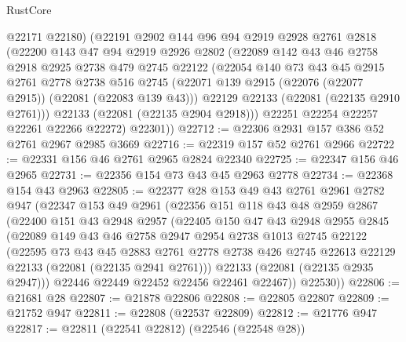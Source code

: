 \begin{lexlean}{RustCore}
\begin{coremodule}
        @22171
        @22180)
      (@22191
        @2902
        @144
        @96
        @94
        @2919
        @2928
        @2761
        @2818
        (@22200
          @143
          @47
          @94
          @2919
          @2926
          @2802
          (@22089
            @142
            @43
            @46
            @2758
            @2918
            @2925
            @2738
            @479
            @2745
            @22122
            (@22054
              @140
              @73
              @43
              @45
              @2915
              @2761
              @2778
              @2738
              @516
              @2745
              (@22071 @139 @2915 (@22076 (@22077 @2915)) (@22081 (@22083 @139 @43)))
              @22129
              @22133
              (@22081 (@22135 @2910 @2761)))
            @22133
            (@22081 (@22135 @2904 @2918)))
          @22251
          @22254
          @22257
          @22261
          @22266
          @22272)
        @22301))
@22712 := @22306 @2931 @157 @386 @52 @2761 @2967 @2985 @3669
@22716 := @22319 @157 @52 @2761 @2966
@22722 := @22331 @156 @46 @2761 @2965 @2824 @22340
@22725 := @22347 @156 @46 @2965
@22731 := @22356 @154 @73 @43 @45 @2963 @2778
@22734 := @22368 @154 @43 @2963
@22805 := @22377
    @28
    @153
    @49
    @43
    @2761
    @2961
    @2782
    @947
    (@22347
      @153
      @49
      @2961
      (@22356
        @151
        @118
        @43
        @48
        @2959
        @2867
        (@22400
          @151
          @43
          @2948
          @2957
          (@22405
            @150
            @47
            @43
            @2948
            @2955
            @2845
            (@22089
              @149
              @43
              @46
              @2758
              @2947
              @2954
              @2738
              @1013
              @2745
              @22122
              (@22595
                @73
                @43
                @45
                @2883
                @2761
                @2778
                @2738
                @426
                @2745
                @22613
                @22129
                @22133
                (@22081 (@22135 @2941 @2761)))
              @22133
              (@22081 (@22135 @2935 @2947)))
            @22446
            @22449
            @22452
            @22456
            @22461
            @22467))
        @22530))
@22806 := @21681 @28
@22807 := @21878 @22806
@22808 := @22805 @22807
@22809 := @21752 @947
@22811 := @22808 (@22537 @22809)
@22812 := @21776 @947
@22817 := @22811 (@22541 @22812) (@22546 (@22548 @28))

\end{coremodule}
\end{lexlean}

